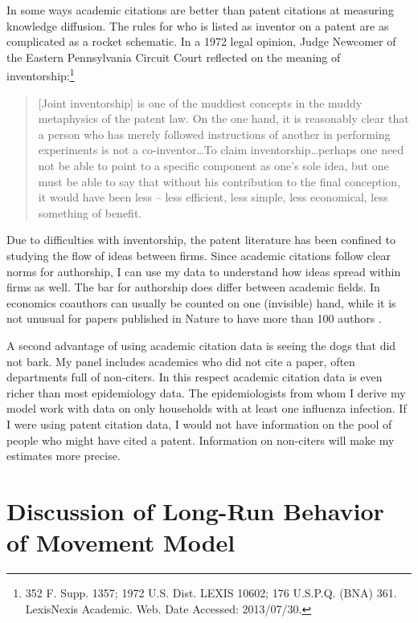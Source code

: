 In some ways academic citations are better than patent citations at
measuring knowledge diffusion. The rules for who is listed as inventor
on a patent are as complicated as a rocket schematic. In a 1972 legal
opinion, Judge Newcomer of the Eastern Pennsylvania Circuit Court
reflected on the meaning of
inventorship:\footnote{352 F. Supp. 1357; 1972 U.S. Dist. LEXIS 10602; 176 U.S.P.Q. (BNA) 361. LexisNexis Academic. Web. Date Accessed: 2013/07/30.}

\begin{quote}
{[}Joint inventorship{]} is one of the muddiest concepts in the muddy
metaphysics of the patent law. On the one hand, it is reasonably clear
that a person who has merely followed instructions of another in
performing experiments is not a co-inventor\ldots{}To claim
inventorship\ldots perhaps one need not be able to point to a specific
component as one's sole idea, but one must be able to say that without
his contribution to the final conception, it would have been less --
less efficient, less simple, less economical, less something of benefit.
\end{quote}

Due to difficulties with inventorship, the patent literature has been
confined to studying the flow of ideas between firms. Since academic
citations follow clear norms for authorship, I can use my data to
understand how ideas spread within firms as well. The bar for authorship
does differ between academic fields. In economics coauthors can usually
be counted on one (invisible) hand, while it is not unusual for papers
published in Nature to have more than 100 authors
\citep{greene2007demise}.

A second advantage of using academic citation data is seeing the dogs
that did not bark. My panel includes academics who did not cite a paper,
often departments full of non-citers. In this respect academic citation
data is even richer than most epidemiology data. The epidemiologists
from whom I derive my model work with data on only households with at
least one influenza infection. If I were using patent citation data, I
would not have information on the pool of people who might have cited a
patent. Information on non-citers will make my estimates more precise.

\section{Discussion of Long-Run Behavior of Movement Model}
\label{sec:movdists}

